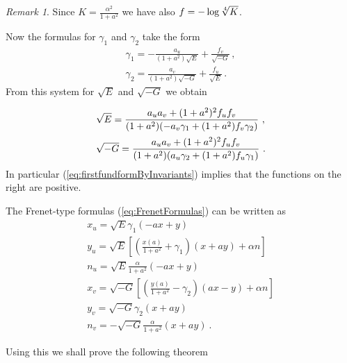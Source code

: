 \documentclass[12pt]{amsart}
\theoremstyle{definition}
\theoremstyle{remark}
\newtheorem{remark}{Remark}[section]
\newcommand{\ds}{\displaystyle}
\begin{document}
\begin{remark} \label{remark:K-aAndalppha}
Since $K=\frac{\alpha^2}{1+a^2}$ we have also $f=-\log\root4\of  K$.
\end{remark}



Now the formulas for $\gamma_1$ and $\gamma_2$ take the form
\begin{equation} \label{eq:gamma1-gamma2}
	\begin{array}{l} 
		\ds \gamma_1	=-\frac{a_u}{(1+a^2)\sqrt E} +\frac{f_v}{\sqrt{-G}} \,, \\
		\ds \gamma_2=\frac{a_v}{(1+a^2)\sqrt{-G}}   + \frac{f_u}{\sqrt E}  \,.  
	\end{array}  
\end{equation}
From this system for $\sqrt E$ and $\sqrt{-G}$ we obtain

\begin{equation} \label{eq:firstfundformByInvariants}
	\begin{array}{l}
		\ds \sqrt E=\frac{a_ua_v+(1+a^2)^2f_uf_v}{(1+a^2)(-a_v\gamma_1+(1+a^2)f_v\gamma_2)} \ ,  \vspace{0,2cm}\\
		\ds \sqrt{-G}=\frac{a_ua_v+(1+a^2)^2f_uf_v}{(1+a^2)(a_u\gamma_2+(1+a^2)f_u\gamma_1)}\ .
	\end{array}  
\end{equation}
In particular (\ref{eq:firstfundformByInvariants}) implies
that the functions on the right are positive.



The Frenet-type formulas (\ref{eq:FrenetFormulas}) can be written as
$$
	\begin{array}{l}
		\ds x_u=\sqrt E\gamma_1(-ax+y)  \\
		\ds y_u=\sqrt E\left[\left(\frac{x(a)}{1+a^2}+\gamma_1\right)(x+ay)  +\alpha n \right]\\
		\ds n_u=\sqrt E\frac{\alpha}{1+a^2}(-ax+y)    \\
		\ds x_v=\sqrt{-G}\left[\left(\frac{y(a)}{1+a^2}-\gamma_2\right)(ax-y)+\alpha n \right]  \\
		\ds y_v=\sqrt{-G}\gamma_2(x+ay  ) \\		
		\ds n_v=-\sqrt{-G}\frac{\alpha}{1+a^2}(x+ay) \ .
	\end{array}
$$



Using this we shall prove the following theorem
\end{document}

